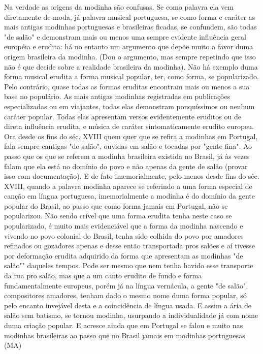 Na verdade as origens da modinha são confusas. Se como palavra ela vem
diretamente de moda, já palavra musical portuguesa, se como forma e
caráter as mais antigas modinhas portuguesas e brasileiras ficadas, se
confundem, são todas "de salão" e demonstram mais ou menos uma sempre
evidente influência geral européia e erudita: há no entanto um argumento
que depõe muito a favor duma origem brasileira da modinha. (Dou o
argumento, mas sempre repetindo que isso não é que decide sobre a
realidade brasileira da modinha). Não há exemplo duma forma musical
erudita a forma musical popular, ter, como forma, se popularizado. Pelo
contrário, quase todas as formas eruditas encontram mais ou menos a sua
base no populário. As mais antigas modinhas registradas em publicações
especializadas ou em viajantes, todas elas demonstram pouquíssimos ou
nenhum caráter popular. Todas elas apresentam versos evidentemente
eruditos ou de direta influência erudita, e música de caráter
sintomaticamente erudito europeu. Ora desde os fins do séc. XVIII quem
quer que se refira a modinhas em Portugal, fala sempre cantigas "de
salão", ouvidas em salão e tocadas por "gente fina". Ao passo que os que
se referem a modinha brasileira existida no Brasil, já às vezes falam
que ela está no domínio do povo e não apenas da gente de salão (provar
isso com documentação). E de fato imemorialmente, pelo menos desde fins
do séc. XVIII, quando a palavra modinha aparece se referindo a uma forma
especial de canção em língua portuguesa, imemorialmente a modinha é do
domínio da gente popular do Brasil, ao passo que como forma jamais em
Portugal, não se popularizou. Não sendo crível que uma forma erudita
tenha neste caso se popularizado, é muito mais evidenciável que a forma
da modinha nascendo e vivendo no povo colonial do Brasil, tenha sido
colhida do povo por amadores refinados ou gozadores apenas e desse então
transportada pros salões e aí tivesse por deformação erudita adquirido
da forma que apresentam as modinhas "de salão"" daqueles tempos. Pode
ser mesmo que nem tenha havido esse transporte da rua pro salão, mas que
a um canto erudito de fundo e forma fundamentalmente europeus, porém já
na língua vernácula, a gente "de salão", compositores amadores, tenham
dado o mesmo nome duma forma popular, só pelo encanto invejável desta e
a coincidência de língua usada. E assim a ária de salão sem batismo, se
tornou modinha, usurpando a individualidade já com nome duma criação
popular. E acresce ainda que em Portugal se falou e muito nas modinhas
brasileiras ao passo que no Brasil jamais em modinhas portuguesas (MA)

